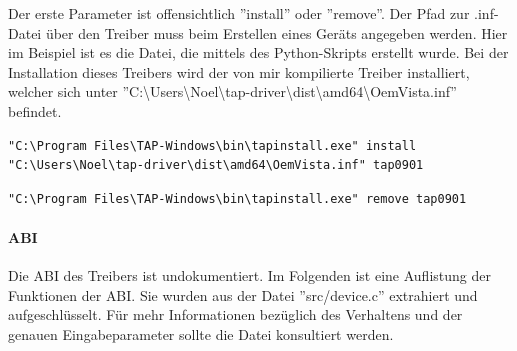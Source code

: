 Der erste Parameter ist offensichtlich ''install'' oder ''remove''. Der Pfad zur .inf-Datei
über den Treiber muss beim Erstellen eines Geräts angegeben werden. Hier im Beispiel
ist es die Datei, die mittels des Python-Skripts erstellt wurde. Bei der Installation
dieses Treibers wird der von mir kompilierte Treiber installiert, welcher sich unter 
''C:\textbackslash{}Users\textbackslash{}Noel\textbackslash{}tap-driver\textbackslash{}dist\textbackslash{}amd64\textbackslash{}OemVista.inf''
befindet.

\begin{lstlisting}[caption=Erstellung eines TAP-Geraets]
"C:\Program Files\TAP-Windows\bin\tapinstall.exe" install "C:\Users\Noel\tap-driver\dist\amd64\OemVista.inf" tap0901
\end{lstlisting}

\begin{lstlisting}[caption=Löschung aller TAP-Geraete]
"C:\Program Files\TAP-Windows\bin\tapinstall.exe" remove tap0901
\end{lstlisting}

\paragraph{ABI}
Die \ac{ABI} des Treibers ist undokumentiert. Im Folgenden ist eine Auflistung
der Funktionen der \ac{ABI}. Sie wurden aus der Datei ''src/device.c'' extrahiert
und aufgeschlüsselt. Für mehr Informationen bezüglich des Verhaltens und der
genauen Eingabeparameter sollte die Datei konsultiert werden.

